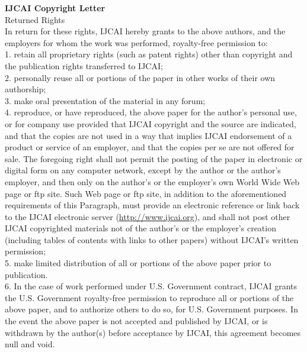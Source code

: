 \documentclass{uicthesi}
\begin{document}
\newpage
\noindent \textbf{IJCAI Copyright Letter}\\
Returned Rights\\
In return for these rights, IJCAI hereby grants to the above authors, and the employers for whom the work was performed, royalty-free permission to:\\
1. retain all proprietary rights (such as patent rights) other than copyright and the publication rights transferred to IJCAI;\\
2. personally reuse all or portions of the paper in other works of their own authorship;\\
3. make oral presentation of the material in any forum;\\
4. reproduce, or have reproduced, the above paper for the author’s personal use, or for company use provided that IJCAI copyright
and the source are indicated, and that the copies are not used in a way that implies IJCAI endorsement of a product or service of an
employer, and that the copies per se are not offered for sale. The foregoing right shall not permit the posting of the paper in electronic or digital form on any computer network, except by the author or the author’s employer, and then only on the author’s or the employer’s own World Wide Web page or ftp site. Such Web page or ftp site, in addition to the aforementioned requirements of this Paragraph,
must provide an electronic reference or link back to the IJCAI electronic server (\url{http://www.ijcai.org}), and shall not post other IJCAI
copyrighted materials not of the author’s or the employer’s creation (including tables of contents with links to other papers) without
IJCAI’s written permission;\\
5. make limited distribution of all or portions of the above paper prior to publication.\\
6. In the case of work performed under U.S. Government contract, IJCAI grants the U.S. Government royalty-free permission to reproduce all or portions of the above paper, and to authorize others to do so, for U.S. Government purposes. In the event the above paper is not
accepted and published by IJCAI, or is withdrawn by the author(s) before acceptance by IJCAI, this agreement becomes null and void.

\bibformb

\end{document}
